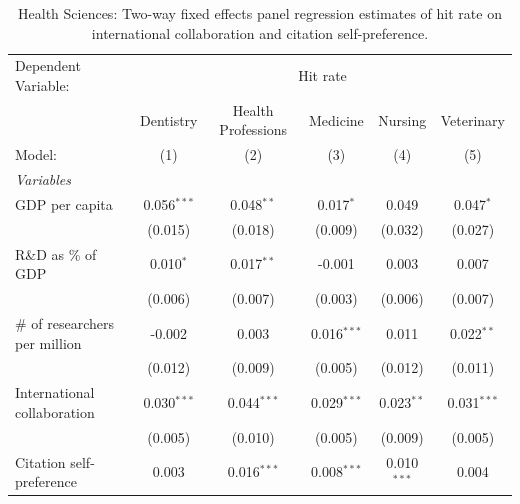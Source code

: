 
\begin{table}[H]
   \caption{\label{tab:H2_hitrate_HealthSciences} Health Sciences: Two-way fixed effects panel regression estimates of hit rate on international
   collaboration and citation self-preference.}
   \centering
   \scriptsize
   \renewcommand*{\arraystretch}{0.7}
   \begin{tabular}{lccccc}
      \tabularnewline \midrule \midrule
      Dependent Variable: & \multicolumn{5}{c}{Hit rate}\\
                                                                     & Dentistry     & Health Professions & Medicine       & Nursing       & Veterinary \\   
      Model:                                                         & (1)           & (2)                & (3)            & (4)           & (5)\\  
      \midrule
      \emph{Variables}\\
      GDP per capita                                                 & 0.056$^{***}$ & 0.048$^{**}$       & 0.017$^{*}$    & 0.049         & 0.047$^{*}$\\   
                                                                     & (0.015)       & (0.018)            & (0.009)        & (0.032)       & (0.027)\\   
      R\&D as \% of GDP                                              & 0.010$^{*}$   & 0.017$^{**}$       & -0.001         & 0.003         & 0.007\\   
                                                                     & (0.006)       & (0.007)            & (0.003)        & (0.006)       & (0.007)\\   
      \# of researchers per million                                  & -0.002        & 0.003              & 0.016$^{***}$  & 0.011         & 0.022$^{**}$\\   
                                                                     & (0.012)       & (0.009)            & (0.005)        & (0.012)       & (0.011)\\   
      International collaboration                                    & 0.030$^{***}$ & 0.044$^{***}$      & 0.029$^{***}$  & 0.023$^{**}$  & 0.031$^{***}$\\   
                                                                     & (0.005)       & (0.010)            & (0.005)        & (0.009)       & (0.005)\\   
      Citation self-preference                                       & 0.003         & 0.016$^{***}$      & 0.008$^{***}$  & 0.010$^{***}$ & 0.004\\   

\end{tabular}
\end{table}
